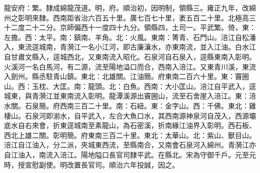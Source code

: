 \begin{pinyinscope}
龍安府：繁。隸成綿龍茂道。明，府。順治初，因明制，領縣三。雍正九年，改綿州之彰明來隸。西南距省治六百五十里。廣七百七十里，袤五百二十里。北極高三十二度二十二分。京師偏西十一度四十九分。領縣四，土司一。平武繁。倚，東：左擔。西：太平。南：鎮南、羊角。北：火風。東南：箐青、石門山。涪江自松潘入，東流逕城南，青漪江一名小江河，即古廉瀼水，亦東南流，並入江油。白水江自甘肅文縣入，逕城西北，又東南流入昭化。石泉河自石泉入，逕縣東南入彰明。火溪河一名白馬河，有二源，流至陽地溢口而合，西南入涪江。又東青川溪，東流入劍州。縣丞駐青山鎮。東北：北雄關。江油簡。府東南二百六十里。東：竇圌山。西：玉枕、大匡。南：龍頭。北：白魚。西南：大小匡山。涪江自平武入，逕城東，與青漪江並東南流入彰明。龍潭溪源出竇圌山，流至石舍崖入涪江。東：涪水關。石泉簡。府西南三百二十里。南：石紐。東：金字山。西：千佛。東北：雞棲山。石泉河即湔水，自平武入，左合大魚口水，其西南源神泉河自茂入，西源壩底水自右來會，折東逕城南至素龍山，為石密溪，折南緣江油界入彰明。西石板、西北上雄二關。彰明簡。府東南三百二十里。東北：太華山。北：紫山、獸目山。涪江自江油入，分二派，夾城東西流，至縣南合，又南會石泉河入綿州。青漪江亦自江油入，南流入涪江。陽地隘口長官司隸平武。在縣北。宋為守御千戶。元至元時，授宣慰副使。明改置長官司。順治六年投誠，因之。


\end{pinyinscope}
